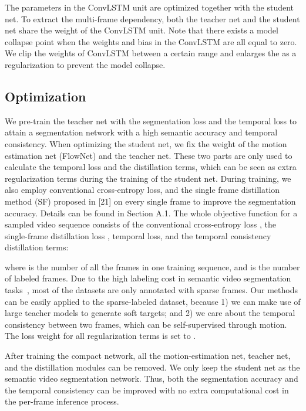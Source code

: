 \documentclass[runningheads]{llncs}
\begin{document}
The parameters in the ConvLSTM unit are optimized together with the student net. To extract the multi-frame dependency, both the teacher net and the student net share the weight of the ConvLSTM unit. Note that there exists a model collapse point when the weights and bias in the ConvLSTM are all equal to zero. We clip the weights of ConvLSTM between a certain range and enlarges the  as a regularization to prevent the model collapse.

\subsection{Optimization}
\label{sec:svsn}
We pre-train the teacher net with the segmentation loss and the temporal loss to
attain
a segmentation network with a high semantic accuracy and temporal consistency. When optimizing the student net, we fix the weight of the motion estimation net (FlowNet) and the teacher net. These two parts are only used to calculate the temporal loss and the distillation
terms, which can be seen as extra regularization
terms
during the training of the student net. During training, we also employ conventional cross-entropy loss, and the single frame distillation method (SF) proposed in [21] on every single frame to improve the segmentation accuracy. Details can be found in Section A.1. The whole objective function for a sampled video sequence consists of the conventional cross-entropy loss , the single-frame distillation loss , temporal loss, and the temporal consistency distillation
terms:

\noindent where  is the number of all the frames in one training sequence, and  is the number of labeled frames. Due to the high labeling cost in semantic video segmentation tasks~\cite{Cordts2016Cityscapes,brostow2008segmentation}, most of the datasets are only annotated with sparse frames. Our methods can be easily applied to the sparse-labeled dataset, because 1) we can make use of large teacher models to generate soft targets; and 2) we care about the temporal consistency between two frames, which can be self-supervised through motion. The loss weight for all regularization
terms
 is set to .

After training the compact network, all the motion-estimation net, teacher net, and the distillation modules can be removed. We only keep the student net as the semantic video segmentation network. Thus, both the segmentation accuracy and the temporal consistency can be improved with no extra computational cost in the per-frame inference process.
\end{document}
